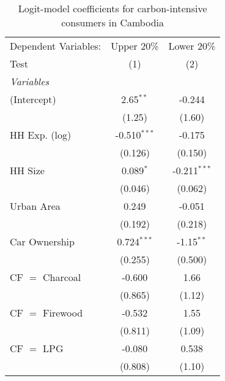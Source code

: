 
\begin{table}[htbp!]
   \centering
   \small
   \begin{adjustbox}{width = 1\textwidth, max height = 0.95\textheight, center}
      \begin{threeparttable}[b]
         \caption{\label{tab:Logit_1_KHM} Logit-model coefficients for carbon-intensive consumers in Cambodia}
         \begin{tabular}{lcc}
            \tabularnewline \midrule \midrule
            Dependent Variables:          & Upper 20\%     & Lower 20\%\\   
            Test                          & (1)            & (2)\\  
            \midrule
            \emph{Variables}\\
            (Intercept)                   & 2.65$^{**}$    & -0.244\\   
                                          & (1.25)         & (1.60)\\   
            HH Exp. (log)                 & -0.510$^{***}$ & -0.175\\   
                                          & (0.126)        & (0.150)\\   
            HH Size                       & 0.089$^{*}$    & -0.211$^{***}$\\   
                                          & (0.046)        & (0.062)\\   
            Urban Area                    & 0.249          & -0.051\\   
                                          & (0.192)        & (0.218)\\   
            Car Ownership                 & 0.724$^{***}$  & -1.15$^{**}$\\   
                                          & (0.255)        & (0.500)\\   
            CF $=$ Charcoal               & -0.600         & 1.66\\   
                                          & (0.865)        & (1.12)\\   
            CF $=$ Firewood               & -0.532         & 1.55\\   
                                          & (0.811)        & (1.09)\\   
            CF $=$ LPG                    & -0.080         & 0.538\\   
                                          & (0.808)        & (1.10)\\   

\end{tabular}
\end{threeparttable}
\end{adjustbox}
\end{table}

